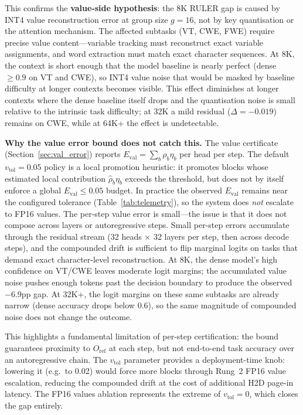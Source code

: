 \documentclass[10pt,twocolumn,a4paper]{article}
\theoremstyle{definition}
\theoremstyle{remark}
\begin{document}
This confirms the \textbf{value-side hypothesis}: the 8K RULER gap is caused by INT4 value reconstruction error at group size $g{=}16$, not by key quantisation or the attention mechanism.  The affected subtasks (VT, CWE, FWE) require precise value content---variable tracking must reconstruct exact variable assignments, and word extraction must match exact character sequences.  At 8K, the context is short enough that the model baseline is nearly perfect (dense ${\geq}0.9$ on VT and CWE), so INT4 value noise that would be masked by baseline difficulty at longer contexts becomes visible.  This effect diminishes at longer contexts where the dense baseline itself drops and the quantisation noise is small relative to the intrinsic task difficulty; at 32K a mild residual ($\Delta{=}{-}0.019$) remains on CWE, while at 64K+ the effect is undetectable.

\textbf{Why the value error bound does not catch this.}  The value certificate (Section~\ref{sec:val_error}) reports $E_{\mathrm{val}} = \sum_b \rho_b \eta_b$ per head per step.  The default $v_{\mathrm{tol}}{=}0.05$ policy is a local promotion heuristic: it promotes blocks whose estimated local contribution $\hat{\rho}_b \eta_b$ exceeds the threshold, but does not by itself enforce a global $E_{\mathrm{val}} \leq 0.05$ budget.  In practice the observed $E_{\mathrm{val}}$ remains near the configured tolerance (Table~\ref{tab:telemetry}), so the system does \emph{not} escalate to FP16 values.  The per-step value error is small---the issue is that it does not compose across layers or autoregressive steps.  Small per-step errors accumulate through the residual stream (32 heads $\times$ 32 layers per step, then across decode steps), and the compounded drift is sufficient to flip marginal logits on tasks that demand exact character-level reconstruction.  At 8K, the dense model's high confidence on VT/CWE leaves moderate logit margins; the accumulated value noise pushes enough tokens past the decision boundary to produce the observed $-6.9$pp gap.  At 32K+, the logit margins on these same subtasks are already narrow (dense accuracy drops below 0.6), so the same magnitude of compounded noise does not change the outcome.

This highlights a fundamental limitation of per-step certification: the bound guarantees proximity to $O_{\mathrm{ref}}$ at each step, but not end-to-end task accuracy over an autoregressive chain.  The $v_{\mathrm{tol}}$ parameter provides a deployment-time knob: lowering it (e.g.\ to 0.02) would force more blocks through Rung~2 FP16 value escalation, reducing the compounded drift at the cost of additional H2D page-in latency.  The FP16 values ablation represents the extreme of $v_{\mathrm{tol}}{=}0$, which closes the gap entirely.
\end{document}
